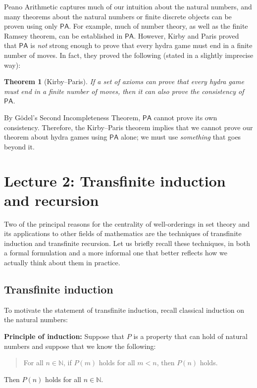 \documentclass[a4paper]{memoir}
\newtheorem{theorem}{Theorem}[section]
\theoremstyle{definition}
\begin{document}
Peano Arithmetic captures much of our intuition about the natural numbers, and many theorems 
about the natural numbers or finite discrete objects can be proven using only $\mathsf{PA}$. For 
example, much of number theory, as well as the finite Ramsey theorem, can be established in 
$\mathsf{PA}$. However, Kirby and Paris proved that $\mathsf{PA}$ is \emph{not} strong enough 
to prove that every hydra game must end in a finite number of moves. In fact, they proved the 
following (stated in a slightly imprecise way):

\begin{theorem}[Kirby--Paris]
  If a set of axioms can prove that every hydra game must end in a finite number of moves, 
  then it can also prove the consistency of $\mathsf{PA}$.
\end{theorem}

By G\"{o}del's Second Incompleteness Theorem, $\mathsf{PA}$ cannot prove its own consistency. 
Therefore, the Kirby--Paris theorem implies that we cannot prove our theorem about hydra games 
using $\mathsf{PA}$ alone; we must use \emph{something} that goes beyond it.

\chapter{Lecture 2: Transfinite induction and recursion}

Two of the principal reasons for the centrality of well-orderings in set theory and its 
applications to other fields of mathematics are the techniques of transfinite induction 
and transfinite recursion. Let us briefly recall these techniques, in both a formal 
formulation and a more informal one that better reflects how we actually think about them in 
practice.

\section{Transfinite induction}

To motivate the statement of transfinite induction, recall classical induction on the natural numbers:

\textbf{Principle of induction:} Suppose that $P$ is a property that can hold of natural numbers and 
suppose that we know the following:
\begin{quote}
  For all $n \in \mathbb{N}$, if $P(m)$ holds for all $m < n$, then $P(n)$ holds.
\end{quote}
Then $P(n)$ holds for all $n \in \mathbb{N}$.
\end{document}
